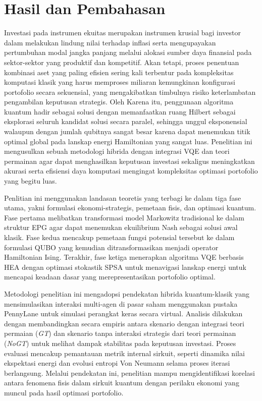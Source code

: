 \chapter{Hasil dan Pembahasan}

Investasi pada instrumen ekuitas merupakan instrumen krusial bagi investor dalam melakukan lindung nilai terhadap inflasi serta mengupayakan pertumbuhan modal jangka panjang melalui alokasi sumber daya finansial pada sektor-sektor yang produktif dan kompetitif. Akan tetapi, proses penentuan kombinasi aset yang paling efisien sering kali terbentur pada kompleksitas komputasi klasik yang harus memproses miliaran kemungkinan konfigurasi portofolio secara sekuensial, yang mengakibatkan timbulnya risiko keterlambatan pengambilan keputusan strategis. Oleh Karena itu, penggunaan algoritma kuantum hadir sebagai solusi dengan memanfaatkan ruang Hilbert sebagai eksplorasi seluruh kandidat solusi secara paralel, sehingga unggul eksponensial walaupun dengan jumlah qubitnya sangat besar karena dapat menemukan titik optimal global pada lanskap energi Hamiltonian yang sangat luas. Penelitian ini mengusulkan sebuah metodologi hibrida dengan integrasi VQE dan teori permainan agar dapat menghasilkan keputusan investasi sekaligus meningkatkan akurasi serta efisiensi daya komputasi mengingat kompleksitas optimasi portofolio yang begitu luas.

Penlitian ini menggunakan landasan teoretis yang terbagi ke dalam tiga fase utama, yakni formulasi ekonomi-strategis, pemetaan fisis, dan optimasi kuantum. Fase pertama melibatkan transformasi model Markowitz tradisional ke dalam struktur EPG agar dapat menemukan ekuilibrium Nash sebagai solusi awal klasik. Fase kedua mencakup pemetaan fungsi potensial tersebut ke dalam formulasi QUBO yang kemudian ditransformasikan menjadi operator Hamiltonian Ising. Terakhir, fase ketiga menerapkan algoritma VQE berbasis HEA dengan optimasi stokastik SPSA untuk menavigasi lanskap energi untuk mencapai keadaan dasar yang merepresentasikan portofolio optimal.

Metodologi penelitian ini mengadopsi pendekatan hibrida kuantum-klasik yang mensimulasikan interaksi multi-agen di pasar saham menggunakan pustaka PennyLane untuk simulasi perangkat keras secara virtual. Analisis dilakukan dengan membandingkan secara empiris antara skenario dengan integrasi teori permaian (\textit{GT}) dan skenario tanpa interaksi strategis dari teori permainan (\textit{NoGT}) untuk melihat dampak stabilitas pada keputusan investasi. Proses evaluasi mencakup pemantauan metrik internal sirkuit, seperti dinamika nilai ekspektasi energi dan evolusi entropi Von Neumann selama proses iterasi berlangsung. Melalui pendekatan ini, penelitian mampu mengidentifikasi korelasi antara fenomena fisis dalam sirkuit kuantum dengan perilaku ekonomi yang muncul pada hasil optimasi portofolio.

